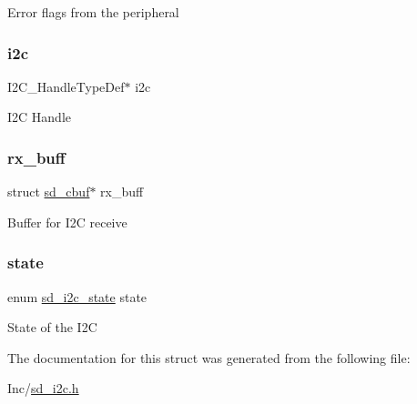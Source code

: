 Error flags from the peripheral \mbox{\label{structsd__i2c__dev_a23e125244a7e27ff9ccc31b3b8495cfe}} 
\subsubsection{\texorpdfstring{i2c}{i2c}}
{\footnotesize\ttfamily I2\+C\+\_\+\+Handle\+Type\+Def$\ast$ i2c}

I2C Handle \mbox{\label{structsd__i2c__dev_a2bc17c33f4234299b83ba5d98edd5887}} 
\subsubsection{\texorpdfstring{rx\+\_\+buff}{rx\_buff}}
{\footnotesize\ttfamily struct \mbox{\hyperlink{structsd__cbuf}{sd\+\_\+cbuf}}$\ast$ rx\+\_\+buff}

Buffer for I2C receive \mbox{\label{structsd__i2c__dev_a98f804dd76a5f720aeed34756d2142e4}} 
\subsubsection{\texorpdfstring{state}{state}}
{\footnotesize\ttfamily enum \mbox{\hyperlink{group___s_d___i2_c___types_gaf9254fee305a19fcc68f616121146552}{sd\+\_\+i2c\+\_\+state}} state}

State of the I2C 

The documentation for this struct was generated from the following file\+:\begin{DoxyCompactItemize}
\item 
Inc/\mbox{\hyperlink{sd__i2c_8h}{sd\+\_\+i2c.\+h}}\end{DoxyCompactItemize}

